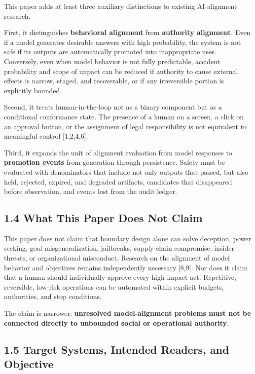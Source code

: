 This paper adds at least three auxiliary distinctions to existing AI-alignment research.

First, it distinguishes \textbf{behavioral alignment} from \textbf{authority alignment}. Even if a model generates desirable answers with high probability, the system is not safe if its outputs are automatically promoted into inappropriate uses. Conversely, even when model behavior is not fully predictable, accident probability and scope of impact can be reduced if authority to cause external effects is narrow, staged, and recoverable, or if any irreversible portion is explicitly bounded.

Second, it treats human-in-the-loop not as a binary component but as a conditional conformance state. The presence of a human on a screen, a click on an approval button, or the assignment of legal responsibility is not equivalent to meaningful control {[}1,2,4,6{]}.

Third, it expands the unit of alignment evaluation from model responses to \textbf{promotion events} from generation through persistence. Safety must be evaluated with denominators that include not only outputs that passed, but also held, rejected, expired, and degraded artifacts, candidates that disappeared before observation, and events lost from the audit ledger.

\subsection{1.4 What This Paper Does Not Claim}\label{what-this-paper-does-not-claim}

This paper does not claim that boundary design alone can solve deception, power seeking, goal misgeneralization, jailbreaks, supply-chain compromise, insider threats, or organizational misconduct. Research on the alignment of model behavior and objectives remains independently necessary {[}8,9{]}. Nor does it claim that a human should individually approve every high-impact act. Repetitive, reversible, low-risk operations can be automated within explicit budgets, authorities, and stop conditions.

The claim is narrower: \textbf{unresolved model-alignment problems must not be connected directly to unbounded social or operational authority}.

\subsection{1.5 Target Systems, Intended Readers, and Objective}\label{target-systems-intended-readers-and-objective}

